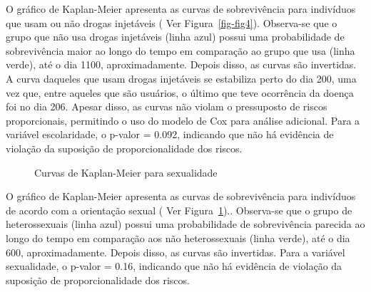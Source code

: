 \documentclass[
  letterpaper,
  DIV=11,
  numbers=noendperiod]{scrreprt}
\begin{document}
O gráfico de Kaplan-Meier apresenta as curvas de sobrevivência para
indivíduos que usam ou não drogas injetáveis ( Ver
Figura~\ref{fig-fig4}). Observa-se que o grupo que não usa drogas
injetáveis (linha azul) possui uma probabilidade de sobrevivência maior
ao longo do tempo em comparação ao grupo que usa (linha verde), até o
dia 1100, aproximadamente. Depois disso, as curvas são invertidas. A
curva daqueles que usam drogas injetáveis se estabiliza perto do dia
200, uma vez que, entre aqueles que são usuários, o último que teve
ocorrência da doença foi no dia 206. Apesar disso, as curvas não violam
o pressuposto de riscos proporcionais, permitindo o uso do modelo de Cox
para análise adicional. Para a variável escolaridade, o p-valor = 0.092,
indicando que não há evidência de violação da suposição de
proporcionalidade dos riscos.

\begin{figure}

\caption{\label{fig-fig5}Curvas de Kaplan-Meier para sexualidade}


\end{figure}%

O gráfico de Kaplan-Meier apresenta as curvas de sobrevivência para
indivíduos de acordo com a orientação sexual ( Ver
Figura~\ref{fig-fig5}).. Observa-se que o grupo de heterossexuais (linha
azul) possui uma probabilidade de sobrevivência parecida ao longo do
tempo em comparação aos não heterossexuais (linha verde), até o dia 600,
aproximadamente. Depois disso, as curvas são invertidas. Para a variável
sexualidade, o p-valor = 0.16, indicando que não há evidência de
violação da suposição de proporcionalidade dos riscos.
\end{document}
